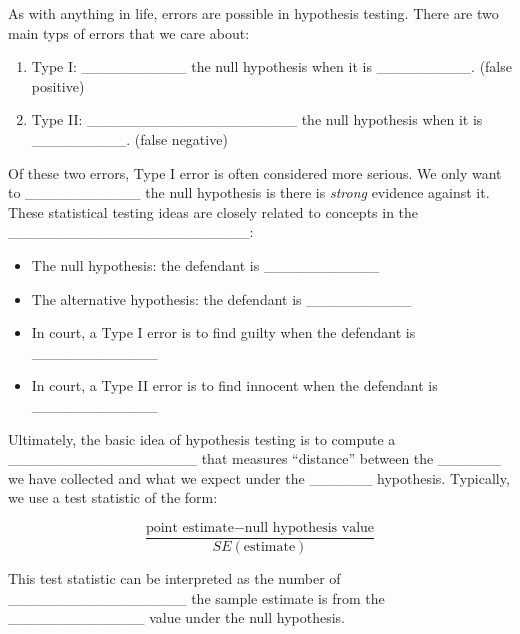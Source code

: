 \documentclass[]{book}
\providecommand{\tightlist}{%
  \setlength{\itemsep}{0pt}\setlength{\parskip}{0pt}}
\theoremstyle{definition}
\theoremstyle{definition}
\theoremstyle{remark}
\begin{document}
As with anything in life, errors are possible in hypothesis testing.
There are two main typs of errors that we care about:

\begin{enumerate}
\def\labelenumi{\arabic{enumi}.}
\tightlist
\item
  Type I: \_\_\_\_\_\_\_\_\_\_ the null hypothesis when it is
  \_\_\_\_\_\_\_\_\_. (false positive) \vspace{.1in}
\item
  Type II: \_\_\_\_\_\_\_\_\_\_\_\_\_\_\_\_\_\_\_\_ the null hypothesis
  when it is \_\_\_\_\_\_\_\_\_. (false negative) \vspace{.1in}
\end{enumerate}

Of these two errors, Type I error is often considered more serious. We
only want to \_\_\_\_\_\_\_\_\_\_\_ the null hypothesis is there is
\emph{strong} evidence against it. These statistical testing ideas are
closely related to concepts in the
\_\_\_\_\_\_\_\_\_\_\_\_\_\_\_\_\_\_\_\_\_\_\_:

\begin{itemize}
\tightlist
\item
  The null hypothesis: the defendant is \_\_\_\_\_\_\_\_\_\_\_
  \vspace{.1in}
\item
  The alternative hypothesis: the defendant is \_\_\_\_\_\_\_\_\_\_
  \vspace{.1in}
\item
  In court, a Type I error is to find guilty when the defendant is
  \_\_\_\_\_\_\_\_\_\_\_\_ \vspace{.1in}
\item
  In court, a Type II error is to find innocent when the defendant is
  \_\_\_\_\_\_\_\_\_\_\_\_
\end{itemize}

Ultimately, the basic idea of hypothesis testing is to compute a
\_\_\_\_\_\_\_\_\_\_\_\_\_\_\_\_\_\_ that measures ``distance'' between
the \_\_\_\_\_\_ we have collected and what we expect under the
\_\_\_\_\_\_ hypothesis. Typically, we use a test statistic of the form:

\begin{equation}\label{eq:teststat}
\frac{\text{point estimate} - \text{null hypothesis value}}{SE(\text{estimate})}
\end{equation}

This test statistic can be interpreted as the number of
\_\_\_\_\_\_\_\_\_\_\_\_\_\_\_\_\_ the sample estimate is from the
\_\_\_\_\_\_\_\_\_\_\_\_\_ value under the null hypothesis.
\end{document}

